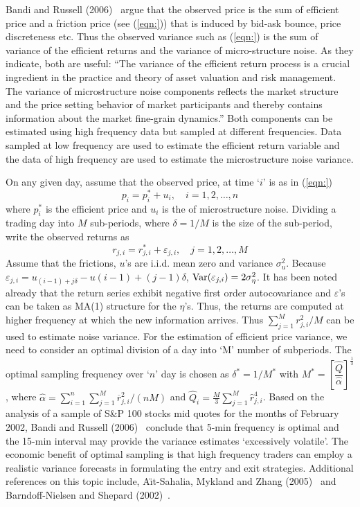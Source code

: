 Bandi and Russell (2006)~\cite{bandi} argue that the observed price is the sum of efficient price and a friction price (see (\ref{eqn:})) that is induced by bid-ask bounce, price discreteness etc. Thus the observed variance such as (\ref{eqn:}) is the sum of variance of the efficient returns and the variance of micro-structure noise. As they indicate, both are useful: ``The variance of the efficient return process is a crucial ingredient in the practice and theory of asset valuation and risk management. The variance of microstructure noise components reflects the market structure and the price setting behavior of market participants and thereby contains information about the market fine-grain dynamics.'' Both components can be estimated using high frequency data but sampled at different frequencies. Data sampled at low frequency are used to estimate the efficient return variable and the data of high frequency are used to estimate the microstructure noise variance.


On any given day, assume that the observed price, at time `$i$' is as in (\ref{eqn:})
	\begin{equation}\label{eqn:2pi2}
	p_i = p_i^* + u_i, \quad i= 1,2,\ldots,n
	\end{equation}
where $p_i^*$ is the efficient price and $u_i$ is the of microstructure noise. Dividing a trading day into $M$ sub-periods, where $\delta= 1/M$ is the size of the sub-period, write the observed returns as
	\begin{equation}\label{eqn:2rji2}
	r_{j,i} = r_{j,i}^* + \varepsilon_{j,i}, \quad j= 1,2,\ldots,M
	\end{equation}
Assume that the frictions, $u$'s are i.i.d. mean zero and variance $\sigma_{u}^2$. Because $\varepsilon_{j,i}= u_{(i-1)+j\delta} - u{(i-1) + (j-1)\delta}$, $\operatorname{Var}(\varepsilon_{j,i})= 2\sigma_{\eta}^2$. It has been noted already that the return series exhibit negative first order autocovariance and $\varepsilon$'s can be taken as MA(1) structure for the $\eta$'s. Thus, the returns are computed at higher frequency at which the new information arrives. Thus $\sum_{j=1}^M r_{j,i}^2/M$ can be used to estimate noise variance. For the estimation of efficient price variance, we need to consider an  optimal division of a day into `M' number of subperiods. The optimal sampling frequency over `$n$' day is chosen as $\delta^* = 1/M^*$ with $M^*= \left[\dfrac{\hat{Q}}{\hat{\alpha}}\right]^{\frac{1}{3}}$, where $\hat{\alpha} = \sum_{i=1}^n\sum_{j=1}^M\overline{r}_{j,i}^2/(nM)$ and $\hat{Q}_i = \frac{M}{3}\sum_{j=1}^M\hat{r}_{j,i}^4$. Based on the analysis of a sample of S\&P 100 stocks mid quotes for the months of February 2002, Bandi and Russell (2006)~\cite{bandi} conclude that 5-min frequency is optimal and the 15-min interval may provide the variance estimates `excessively volatile'. The economic benefit of optimal sampling is that high frequency traders can employ a realistic variance forecasts in formulating the entry and exit strategies. Additional references on this topic include, A{\"\i}t-Sahalia, Mykland and Zhang (2005)~\cite{ait2005often} and Barndoff-Nielsen and Shepard (2002)~\cite{barndorff2002econometric}.


